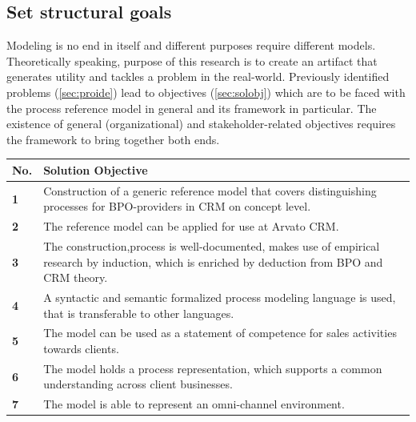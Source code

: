 	\subsection{Set structural goals}
	
	Modeling is no end in itself and different purposes require different models. Theoretically speaking, purpose of this research is to create an artifact that generates utility and tackles a problem in the real-world.  Previously identified problems (\ref{sec:proide}) lead to objectives (\ref{sec:solobj}) which are to be faced with the process reference model in general and its framework in particular. The existence of general (organizational) and stakeholder-related objectives requires the framework to bring together both ends.
	
	\begin{table}[caption={Solution Objectives}, label={tab:solobj}]
		\centering
		\begin{tabular}{l p{13.3cm}}

			\textbf{No. }&\textbf{ Solution Objective}
			 \\ \hline
			\textbf{1 }                        & Construction of a generic reference model that covers distinguishing processes for BPO-providers in CRM on concept level.                                                    \\ \hline
			\textbf{2}                         & The reference model can be applied for use at Arvato CRM.                                                                                                                    \\ \hline
			\textbf{3 }                        & The construction,process is well-documented, makes use of empirical research by induction, which is enriched by deduction from \acrshort{BPO} and \acrshort{CRM} theory. \\ \hline
			\textbf{4}                         & A syntactic and semantic formalized process modeling language is used, that is transferable to other languages.                                                              \\ \hline
			\textbf{5}                         & The model can be used as a statement of competence for sales activities towards clients.                                                                                     \\ \hline
			\textbf{6}                         & The model holds a process representation, which supports a common understanding across client businesses.                                                                    \\ \hline
			\textbf{7}                         & The model is able to represent an omni-channel environment.                                                                                                                 
		\end{tabular}
	\end{table}

